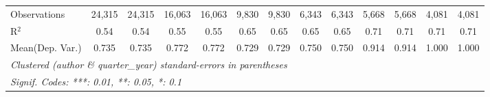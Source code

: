 \begin{tabular}{lcccccccccccc}
   Observations                             & 24,315       & 24,315        & 16,063       & 16,063        & 9,830   & 9,830          & 6,343   & 6,343          & 5,668   & 5,668         & 4,081   & 4,081\\  
   R$^2$                                    & 0.54         & 0.54          & 0.55         & 0.55          & 0.65    & 0.65           & 0.65    & 0.65           & 0.71    & 0.71          & 0.71    & 0.71\\  
Mean(Dep. Var.) & 0.735 & 0.735 & 0.772 & 0.772 & 0.729 & 0.729 & 0.750 & 0.750 & 0.914 & 0.914 & 1.000 & 1.000 \\
   \midrule \midrule
   \multicolumn{13}{l}{\emph{Clustered (author \& quarter\_year) standard-errors in parentheses}}\\
   \multicolumn{13}{l}{\emph{Signif. Codes: ***: 0.01, **: 0.05, *: 0.1}}\\
\end{tabular}
\par\endgroup
